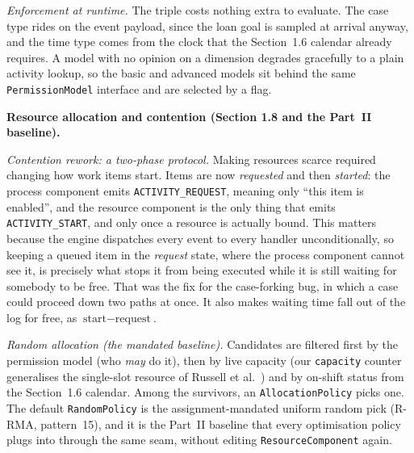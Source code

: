 \emph{Enforcement at runtime.} The triple costs nothing extra to evaluate. The
case type rides on the event payload, since the loan goal is sampled at arrival
anyway, and the time type comes from the clock that the Section~1.6 calendar
already requires. A model with no opinion on a dimension degrades gracefully to
a plain activity lookup, so the basic and advanced models sit behind the same
\texttt{PermissionModel} interface and are selected by a flag.


\textbf{Resource allocation and contention (Section 1.8 and the Part~II
baseline).}

\emph{Contention rework: a two-phase protocol.} Making resources scarce
required changing how work items start. Items are now \emph{requested} and then
\emph{started}: the process component emits \texttt{ACTIVITY\_REQUEST}, meaning
only ``this item is enabled'', and the resource component is the only thing
that emits \texttt{ACTIVITY\_START}, and only once a resource is actually
bound. This matters because the engine dispatches every event to every handler
unconditionally, so keeping a queued item in the \emph{request} state, where
the process component cannot see it, is precisely what stops it from being
executed while it is still waiting for somebody to be free. That was the fix
for the case-forking bug, in which a case could proceed down two paths at once.
It also makes waiting time fall out of the log for free, as
$\text{start} - \text{request}$.

\emph{Random allocation (the mandated baseline).} Candidates are filtered first
by the permission model (who \emph{may} do it), then by live capacity (our
\texttt{capacity} counter generalises the single-slot resource of Russell et
al.~\cite{russell2005workflow}) and by on-shift status from the Section~1.6
calendar. Among the survivors, an \texttt{AllocationPolicy} picks one. The
default \texttt{RandomPolicy} is the assignment-mandated uniform random pick
(R-RMA, pattern~15), and it is the Part~II baseline that every optimisation
policy plugs into through the same seam, without editing
\texttt{ResourceComponent} again.

